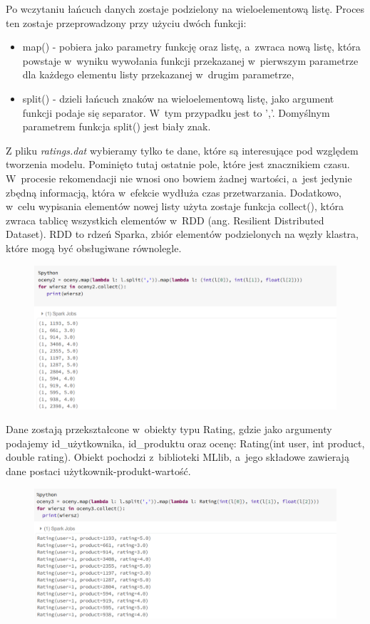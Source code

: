 \documentclass[12pt,a4paper]{report}
\begin{document}
Po wczytaniu łańcuch danych zostaje podzielony na wieloelementową listę. Proces ten zostaje przeprowadzony przy użyciu dwóch funkcji:
\begin{itemize}
\item map() - pobiera jako parametry funkcję oraz listę, a~zwraca nową listę, która powstaje w~wyniku wywołania funkcji przekazanej w~pierwszym parametrze dla każdego elementu listy przekazanej w~drugim parametrze,
\item split() - dzieli łańcuch znaków na wieloelementową listę, jako argument funkcji podaje się separator. W~tym przypadku jest to ','. Domyślnym parametrem funkcja split() jest biały znak.
\end{itemize}
Z pliku \textit{ratings.dat} wybieramy tylko te dane, które są interesujące pod względem tworzenia modelu. Pominięto tutaj ostatnie pole, które jest znacznikiem czasu. W~procesie rekomendacji nie wnosi ono bowiem żadnej wartości, a~jest jedynie zbędną informacją, która w~efekcie wydłuża czas przetwarzania.
Dodatkowo, w~celu wypisania elementów nowej listy użyta zostaje funkcja collect(), która zwraca tablicę wszystkich elementów w~RDD (ang. Resilient Distributed Dataset). RDD to rdzeń Sparka,  zbiór elementów podzielonych na węzły klastra, które mogą być obsługiwane równolegle.

\begin{figure}[H]
\includegraphics[scale=0.5]{obrazy/ALS3.PNG} 
\end{figure}

Dane zostają przekształcone w~obiekty typu Rating, gdzie jako argumenty podajemy id\_użytkownika, id\_produktu oraz ocenę: Rating(int user, int product, double rating). Obiekt pochodzi z~biblioteki MLlib, a~jego składowe zawierają dane postaci użytkownik-produkt-wartość.

\begin{figure}[H]
\includegraphics[scale=0.5]{obrazy/ALS4.PNG} 
\end{figure}
\end{document}

